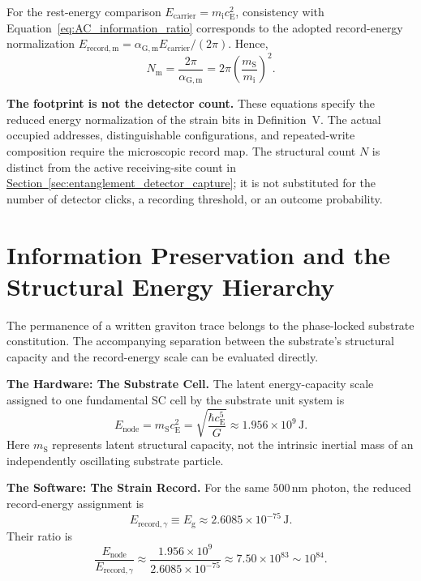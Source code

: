 For the rest-energy comparison $E_{\mathrm{carrier}}=m_{\mathrm i}c_{\mathrm E}^{2}$, consistency with Equation~\eqref{eq:AC_information_ratio} corresponds to the adopted record-energy normalization $E_{\mathrm{record},\mathrm m}=\alpha_{\mathrm G,\mathrm m}E_{\mathrm{carrier}}/(2\pi)$. Hence,
\begin{equation}
    N_{\mathrm m}
    =\frac{2\pi}{\alpha_{\mathrm G,\mathrm m}}
    =2\pi\left(\frac{m_{\mathrm S}}{m_{\mathrm i}}\right)^{2}.
    \label{eq:AC_matter_information_identity}
\end{equation}

\noindent\textbf{The footprint is not the detector count.}
These equations specify the reduced energy normalization of the strain bits in Definition~V. The actual occupied addresses, distinguishable configurations, and repeated-write composition require the microscopic record map. The structural count $N$ is distinct from the active receiving-site count in \hyperref[sec:entanglement_detector_capture]{Section~\ref*{sec:entanglement_detector_capture}}; it is not substituted for the number of detector clicks, a recording threshold, or an outcome probability.

\section{Information Preservation and the Structural Energy Hierarchy}
\label{sec:AC_structural_energy_hierarchy}

The permanence of a written graviton trace belongs to the phase-locked substrate constitution. The accompanying separation between the substrate's structural capacity and the record-energy scale can be evaluated directly.

\noindent\textbf{The Hardware: The Substrate Cell.}
The latent energy-capacity scale assigned to one fundamental SC cell by the substrate unit system is
\begin{equation}
    E_{\mathrm{node}}
    =m_{\mathrm S}c_{\mathrm E}^{2}
    =\sqrt{\frac{\hbar c_{\mathrm E}^{5}}{G}}
    \approx1.956\times10^{9}\,\mathrm J.
    \label{eq:AC_substrate_energy_scale}
\end{equation}
Here $m_{\mathrm S}$ represents latent structural capacity, not the intrinsic inertial mass of an independently oscillating substrate particle.

\medskip
\noindent\textbf{The Software: The Strain Record.}
For the same $500\,\mathrm{nm}$ photon, the reduced record-energy assignment is
\begin{equation}
    E_{\mathrm{record},\gamma}
    \equiv E_{\mathrm g}
    \approx2.6085\times10^{-75}\,\mathrm J.
    \label{eq:AC_record_energy_example}
\end{equation}
Their ratio is
\begin{equation}
    \frac{E_{\mathrm{node}}}{E_{\mathrm{record},\gamma}}
    \approx\frac{1.956\times10^{9}}{2.6085\times10^{-75}}
    \approx7.50\times10^{83}
    \sim10^{84}.
    \label{eq:AC_structural_energy_ratio}
\end{equation}

